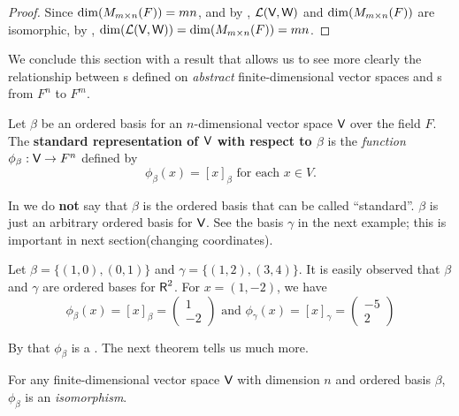 \begin{proof}
Since \(\dim(M_{m \times n}(F)) = mn\), and by , \(\mathcal{L}(\textsf{V}, \textsf{W})\) and \(\dim(M_{m \times n}(F))\) are isomorphic, by , \(\dim(\mathcal{L}(\textsf{V}, \textsf{W})) = \dim(M_{m \times n}(F)) = mn\).
\end{proof}

We conclude this section with a result that allows us to see more clearly the relationship between \LTRAN{}s defined on \emph{abstract} finite-dimensional vector spaces and \LTRAN{}s from \(F^n\) to \(F^m\).

\begin{definition} \label{def 2.15}
Let \(\beta\) be an ordered basis for an \(n\)-dimensional vector space \(\textsf{V}\) over the field \(F\).
The \textbf{standard representation of \(\textsf{V}\) with respect to \(\beta\)} is the \emph{function} \(\phi_{\beta} : \textsf{V} \to F^n\) defined by
\[
    \phi_{\beta}(x) = [x]_{\beta} \text{ for each } x \in V.
\]
\end{definition}

\begin{note}
In  we do \textbf{not} say that \(\beta\) is the ordered basis that can be called ``standard''.
\(\beta\) is just an arbitrary ordered basis for \(\textsf{V}\).
See the basis \(\gamma\) in the next example; this is important in next section(changing coordinates).
\end{note}

\begin{example} \label{example 2.4.6}
Let \(\beta = \{ (1, 0), (0, 1) \}\) and \(\gamma = \{ (1, 2), (3, 4) \}\).
It is easily observed that \(\beta\) and \(\gamma\) are ordered bases for \(\textsf{R}^2\).
For \(x = (1, -2)\), we have
\[
    \phi_{\beta}(x) = [x]_{\beta} = \begin{pmatrix} 1 \\ -2 \end{pmatrix}
    \text{ and }
    \phi_{\gamma}(x) = [x]_{\gamma} = \begin{pmatrix} -5 \\ 2 \end{pmatrix}
\]
\end{example}

By  that \(\phi_{\beta}\) is a \LTRAN{}.
The next theorem tells us much more.

\begin{theorem} \label{thm 2.21}
For any finite-dimensional vector space \(\textsf{V}\) with dimension \(n\) and ordered basis \(\beta\), \(\phi_{\beta}\) is an \emph{isomorphism}.
\end{theorem}

